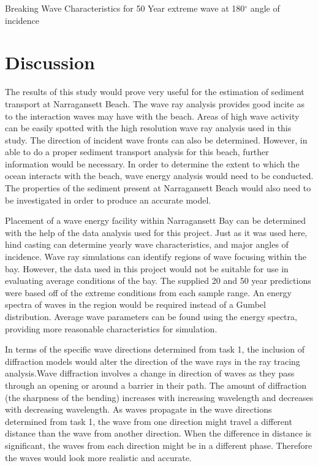 \begin{table}[H]
\centering

\caption{Breaking Wave Characteristics for 50 Year extreme wave at 180$^{\circ}$ angle of incidence}
\label{tab:50y_180deg}
\end{table}

\section{Discussion}
The results of this study would prove very useful for the estimation of sediment transport at Narragansett Beach. The wave ray analysis provides good incite as to the interaction waves may have with the beach. Areas of high wave activity can be easily spotted with the high resolution wave ray analysis used in this study. The direction of incident wave fronts can also be determined. However, in able to do a proper sediment transport analysis for this beach, further information would be necessary. In order to determine the extent to which the ocean interacts with the beach, wave energy analysis would need to be conducted. The properties of the sediment present at Narragansett Beach would also need to be investigated in order to produce an accurate model.

Placement of a wave energy facility within Narragansett Bay can be determined with the help of the data analysis used for this project. Just as it was used here, hind casting can determine yearly wave characteristics, and major angles of incidence. Wave ray simulations can identify regions of wave focusing within the bay. However, the data used in this project would not be suitable for use in evaluating average conditions of the bay. The supplied 20 and 50 year predictions were based off of the extreme conditions from each sample range. An energy spectra of waves in the region would be required instead of a Gumbel distribution. Average wave parameters can be found using the energy spectra, providing more reasonable characteristics for simulation.


In terms of the specific wave directions determined from task 1, the inclusion of diffraction models would alter the direction of the wave rays in the ray tracing analysis.Wave diffraction involves a change in direction of waves as they pass through an opening or around a barrier in their path. The amount of diffraction (the sharpness of the bending) increases with increasing wavelength and decreases with decreasing wavelength. As waves propagate in the wave directions determined from task 1, the wave from one direction might travel a different distance than the wave from another direction. When the difference in distance is significant, the waves from each direction might be in a different phase. Therefore the waves would look more realistic and accurate.


